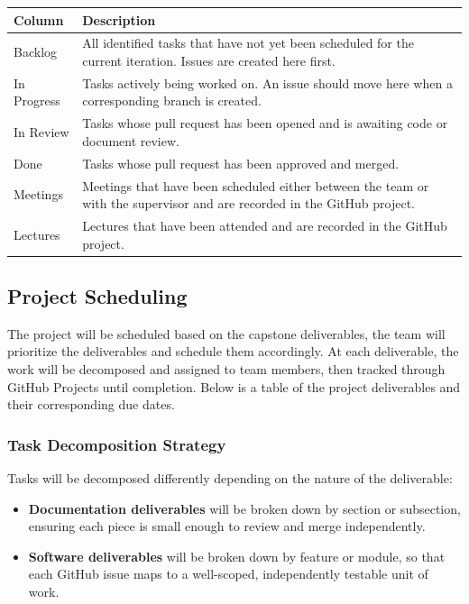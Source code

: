 \documentclass{article}
\begin{document}
\begin{center}
\begin{tabularx}{\textwidth}{lX}
  \toprule
  \textbf{Column} & \textbf{Description} \\
  \midrule
  Backlog     & All identified tasks that have not yet been scheduled for the current
                iteration. Issues are created here first. \\
  In Progress & Tasks actively being worked on. An issue should move here when a
                corresponding branch is created. \\
  In Review   & Tasks whose pull request has been opened and is awaiting code or
                document review. \\
  Done        & Tasks whose pull request has been approved and merged. \\
  Meetings    & Meetings that have been scheduled either between the team or with the supervisor and are recorded in the GitHub project. \\
  Lectures    & Lectures that have been attended and are recorded in the GitHub project. \\
  \bottomrule
\end{tabularx}
\end{center}

\subsection{Project Scheduling}

The project will be scheduled based on the capstone deliverables, the team will prioritize the deliverables and schedule them accordingly. At each deliverable, the work will be decomposed and assigned to team members, then tracked through GitHub Projects until completion. Below is a table of the project deliverables and their corresponding due dates.

\subsubsection*{Task Decomposition Strategy}

Tasks will be decomposed differently depending on the nature of the deliverable:

\begin{itemize}
  \item \textbf{Documentation deliverables} will be broken down by section or subsection, ensuring each piece is small enough to review and merge independently.
  \item \textbf{Software deliverables} will be broken down by feature or module, so that each GitHub issue maps to a well-scoped, independently testable unit of work.
\end{itemize}
\end{document}
